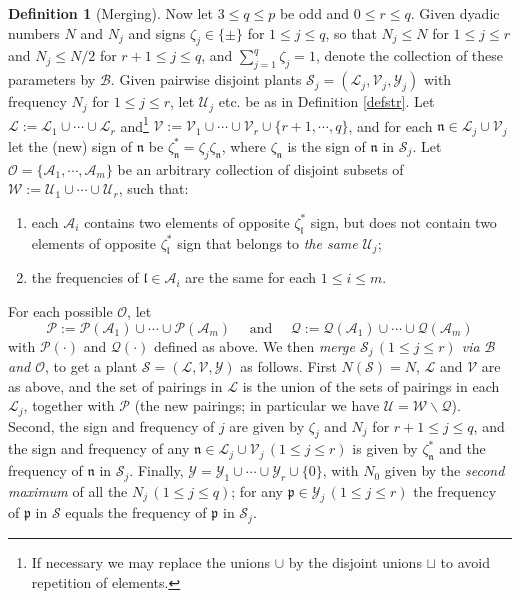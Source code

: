 \documentclass[11 pt,reqno]{amsart}
\theoremstyle{definition}
\newtheorem{df}[thm]{Definition}
\theoremstyle{remark}
\numberwithin{equation}{section}
\newcommand{\Sc}{\mathcal{S}}
\newcommand{\Lc}{\mathcal{L}}
\newcommand{\Qc}{\mathcal{Q}}
\newcommand{\Uc}{\mathcal{U}}
\newcommand{\Ac}{\mathcal{A}}
\newcommand{\Vc}{\mathcal{V}}
\newcommand{\Wc}{\mathcal{W}}
\newcommand{\Yc}{\mathcal{Y}}
\newcommand{\pf}{\mathfrak{p}}
\newcommand{\nf}{\mathfrak{n}}
\newcommand{\lf}{\mathfrak{l}}
\newcommand{\Bs}{\mathscr{B}}
\newcommand{\Ps}{\mathscr{P}}
\newcommand{\Os}{\mathscr{O}}
\begin{document}
{\begin{df}[Merging]
 Now let $3\leq q\leq p$ be odd and $0\leq r\leq q$. Given dyadic numbers $N$ and $N_j$ and signs $\zeta_j\in\{\pm\}$ for $1\leq j\leq q$, so that $N_j\leq N$ for $1\leq j\leq r$ and $N_j\leq N/2$ for $r+1\leq j\leq q$, and $\sum_{j=1}^q\zeta_j=1$, denote the collection of these parameters by $\Bs$. Given pairwise disjoint plants $\Sc_j=(\Lc_j,\Vc_j,\Yc_j)$ with frequency $N_j$ for $1\leq j\leq r$, let $\Uc_j$ etc. be as in Definition \ref{defstr}. Let $\Lc:=\Lc_1\cup\cdots \cup\Lc_{r}$ and\footnote{If necessary we may replace the unions $\cup$ by the disjoint unions $\sqcup$ to avoid repetition of elements.} $\Vc:=\Vc_1\cup\cdots\cup\Vc_{r}\cup\{r+1,\cdots,q\}$, and for each $\nf\in\Lc_j\cup\Vc_j$ let the (new) sign of $\nf$ be $\zeta_\nf^*=\zeta_j\zeta_\nf$, where $\zeta_\nf$ is the sign of $\nf$ in $\Sc_j$. Let $\Os=\{\Ac_1,\cdots,\Ac_m\}$ be an arbitrary collection of disjoint subsets of $\Wc:=\Uc_1\cup\cdots\cup\Uc_{r}$, such that:
 \begin{enumerate}
 \item each $\Ac_i$ contains two elements of opposite $\zeta_\lf^*$ sign, but does not contain two elements of opposite $\zeta_\lf^*$ sign that belongs to \emph{the same} $\Uc_j$; \item the frequencies of $\lf\in\Ac_i$ are the same for each $1\leq i\leq m$.
 \end{enumerate} For each possible $\Os$, let 
 \begin{equation}\label{def3.6:Q}
 \Ps:=\Ps(\Ac_1)\cup\cdots\cup\Ps(\Ac_m)\quad \text{ and }\quad \Qc:=\Qc(\Ac_1)\cup\cdots\cup\Qc(\Ac_m)
  \end{equation}
  with $\Ps(\cdot)$ and $\Qc(\cdot)$ defined as above. We then \emph{merge $\Sc_j\,(1\leq j\leq r)$ via $\Bs$ and $\Os$}, to get a plant $\Sc=(\Lc,\Vc,\Yc)$ as follows. First $N(\Sc)=N$, $\Lc$ and $\Vc$ are as above, and the set of pairings in $\Lc$ is the union of the sets of pairings in each $\Lc_j$, together with $\Ps$ (the new pairings; in particular we have $\Uc=\Wc\backslash\Qc$). Second, the sign and frequency of $j$ are given by $\zeta_j$ and $N_j$ for $r+1\leq j\leq q$, and the sign and frequency of any $\nf\in\Lc_j\cup\Vc_j\,(1\leq j\leq r)$ is given by $\zeta_\nf^*$ and the frequency of $\nf$ in $\Sc_j$. Finally, $\Yc=\Yc_1\cup\cdots\cup\Yc_{r}\cup\{0\}$, with $N_0$ given by the \emph{second maximum} of all the $N_j\,(1\leq j\leq q)$; for any $\pf\in\Yc_j\,(1\leq j\leq r)$ the frequency of $\pf$ in $\Sc$ equals the frequency of $\pf$ in $\Sc_j$.
 

\end{df}}
\end{document}
